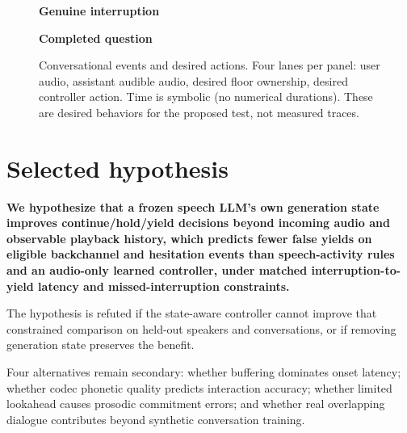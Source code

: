 \documentclass[11pt]{article}
\begin{document}
\begin{figure}[htbp]
\vspace{0.6em}
\begin{minipage}{0.48\textwidth}
\centering
\footnotesize\textbf{Genuine interruption}\\[2pt]
\end{minipage}
\hfill
\begin{minipage}{0.48\textwidth}
\centering
\footnotesize\textbf{Completed question}\\[2pt]
\end{minipage}
\caption{Conversational events and desired actions. Four lanes per panel: user audio, assistant audible audio, desired floor ownership, desired controller action. Time is symbolic (no numerical durations). These are desired behaviors for the proposed test, not measured traces.}
\label{fig:events}
\end{figure}

\section{Selected hypothesis}

\textbf{We hypothesize that a frozen speech LLM's own generation state improves continue/hold/yield decisions beyond incoming audio and observable playback history, which predicts fewer false yields on eligible backchannel and hesitation events than speech-activity rules and an audio-only learned controller, under matched interruption-to-yield latency and missed-interruption constraints.}

The hypothesis is refuted if the state-aware controller cannot improve that constrained comparison on held-out speakers and conversations, or if removing generation state preserves the benefit.

Four alternatives remain secondary: whether buffering dominates onset latency; whether codec phonetic quality predicts interaction accuracy; whether limited lookahead causes prosodic commitment errors; and whether real overlapping dialogue contributes beyond synthetic conversation training.
\end{document}

